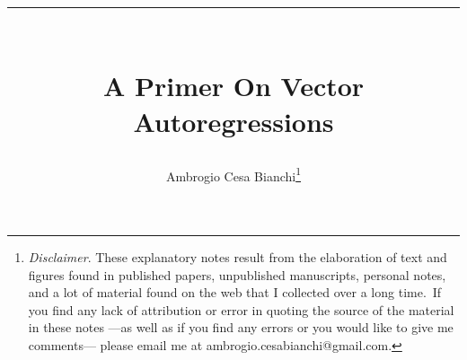 \documentclass[11pt,a4paper]{report}
\numberwithin{equation}{chapter}
\numberwithin{section}{chapter}
\begin{document}
\title{%
\rule{\textwidth}{.04cm}%
\\
A Primer On Vector Autoregressions}
\author{{\small Ambrogio Cesa Bianchi\thanks{
\emph{Disclaimer}. These explanatory notes result from the elaboration of
text and figures found in published papers, unpublished manuscripts,
personal notes, and a lot of material found on the web that I collected over
a long time.\ If you find any lack of attribution or error in quoting the
source of the material in these notes ---as well as if you find any errors
or you would like to give me comments--- please email me at
ambrogio.cesabianchi@gmail.com.}} \and 
\rule{\textwidth}{.04cm}%
}
\maketitle
\tableofcontents

\onehalfspacing
\newpage
\end{document}
